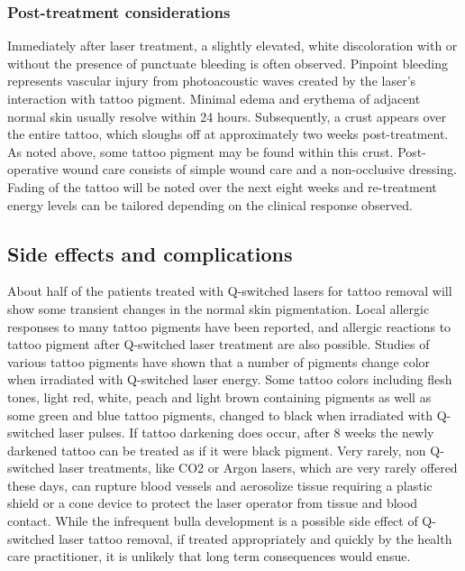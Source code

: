 \documentclass[12pt]{article}
\begin{document}
\subsubsection{Post-treatment considerations
}Immediately after laser treatment, a slightly elevated, white discoloration with or without the presence of punctuate bleeding is often observed.
Pinpoint bleeding represents vascular injury from photoacoustic waves created by the laser's interaction with tattoo pigment.
Minimal edema and erythema of adjacent normal skin usually resolve within 24 hours.
Subsequently, a crust appears over the entire tattoo, which sloughs off at approximately two weeks post-treatment.
As noted above, some tattoo pigment may be found within this crust.
Post-operative wound care consists of simple wound care and a non-occlusive dressing.
Fading of the tattoo will be noted over the next eight weeks and re-treatment energy levels can be tailored depending on the clinical response observed.


\subsection{Side effects and complications}
About half of the patients treated with Q-switched lasers for tattoo removal will show some transient changes in the normal skin pigmentation.
Local allergic responses to many tattoo pigments have been reported, and allergic reactions to tattoo pigment after Q-switched laser treatment are also possible.
Studies of various tattoo pigments have shown that a number of pigments change color when irradiated with Q-switched laser energy.
Some tattoo colors including flesh tones, light red, white, peach and light brown containing pigments as well as some green and blue tattoo pigments, changed to black when irradiated with Q-switched laser pulses.
If tattoo darkening does occur, after 8 weeks the newly darkened tattoo can be treated as if it were black pigment.
Very rarely, non Q-switched laser treatments, like CO2 or Argon lasers, which are very rarely offered these days, can rupture blood vessels and aerosolize tissue requiring a plastic shield or a cone device to protect the laser operator from tissue and blood contact.
While the infrequent bulla development is a possible side effect of Q-switched laser tattoo removal, if treated appropriately and quickly by the health care practitioner, it is unlikely that long term consequences would ensue.
\end{document}
